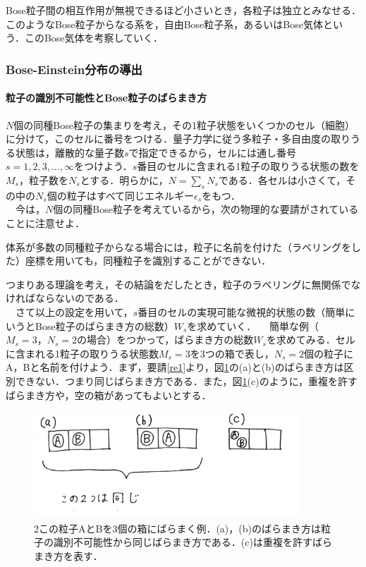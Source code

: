 \part{}
Bose粒子間の相互作用が無視できるほど小さいとき，各粒子は独立とみなせる．このようなBose粒子からなる系を，自由Bose粒子系，あるいはBose気体という．このBose気体を考察していく．
%
\section{Bose-Einstein分布の導出}
%
\subsection{粒子の識別不可能性とBose粒子のばらまき方}
$N$個の同種Bose粒子の集まりを考え，その1粒子状態をいくつかのセル（細胞）に分けて，このセルに番号をつける．量子力学に従う多粒子・多自由度の取りうる状態は，離散的な量子数$s$で指定できるから，セルには通し番号$s=1,2,3,\ldots,\infty$をつけよう．$s$番目のセルに含まれる1粒子の取りうる状態の数を$M_s$，粒子数を$N_s$とする．明らかに，$N=\sum_sN_s$である．各セルは小さくて，その中の$N_s$個の粒子はすべて同じエネルギー$\epsilon_s$をもつ．\\
　今は，$N$個の同種Bose粒子を考えているから，次の物理的な要請がされていることに注意せよ．
%
%
\begin{kotak}
	\begin{request}[粒子の識別不可能性]\label{re1}
	体系が多数の同種粒子からなる場合には，粒子に名前を付けた（ラベリングをした）座標を用いても，同種粒子を識別することができない．		
	\end{request}
\end{kotak}
つまりある理論を考え，その結論をだしたとき，粒子のラベリングに無関係でなければならないのである．\\
%
%
　さて以上の設定を用いて，$s$番目のセルの実現可能な微視的状態の数（簡単にいうとBose粒子のばらまき方の総数）$W_s$を求めていく．
　簡単な例（$M_s=3，N_s=2$の場合）をつかって，ばらまき方の総数$W_s$を求めてみる．セルに含まれる1粒子の取りうる状態数$M_s=3$を3つの箱で表し，$N_s=2$個の粒子にA，Bと名前を付けよう．まず，要請\ref{re1}より，図\ref{g1}の(a)と(b)のばらまき方は区別できない．つまり同じばらまき方である．また，図\ref{g1}(c)のように，重複を許すばらまき方や，空の箱があってもよいとする．
%
%
　\begin{figure}[H]
 \centering
\includegraphics[width=10cm,height=4cm]{file/basic_st/fig/bo1.png}
  \caption{2この粒子AとBを3個の箱にばらまく例．(a)，(b)のばらまき方は粒子の識別不可能性から同じばらまき方である．(c)は重複を許すばらまき方を表す．}
  \label{g1}
\end{figure}
%


